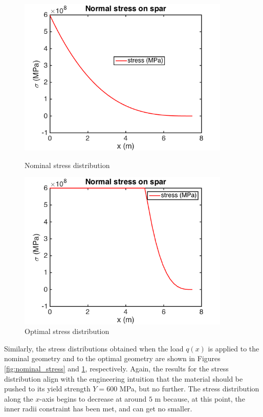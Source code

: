 \documentclass[11pt]{article}
\begin{document}
\begin{figure}[hbt!]
\centering
\begin{minipage}[b]{0.4\textwidth}
\includegraphics[width=0.9\textwidth]{nominal_stress}
\caption{Nominal stress distribution}
\label{fig:nominal_stress}
\end{minipage}
\begin{minipage}[b]{0.4\textwidth}
\includegraphics[width=0.9\textwidth]{optimal_stress}
\caption{Optimal stress distribution}
\label{fig:optimal_stress}
\end{minipage}
\end{figure}

Similarly, the stress distributions obtained when the
load $q(x)$ is applied to the nominal geometry and to
the optimal geometry are shown in Figures
\ref{fig:nominal_stress} and \ref{fig:optimal_stress},
respectively. Again, the results for the stress
distribution align with the engineering intuition
that the material should be pushed to its yield
strength $Y = 600$ MPa, but no further. The stress
distribution along the $x$-axis begins to decrease
at around $5$ m because, at this point, the
inner radii constraint has been met, and can get
no smaller.
\end{document}
